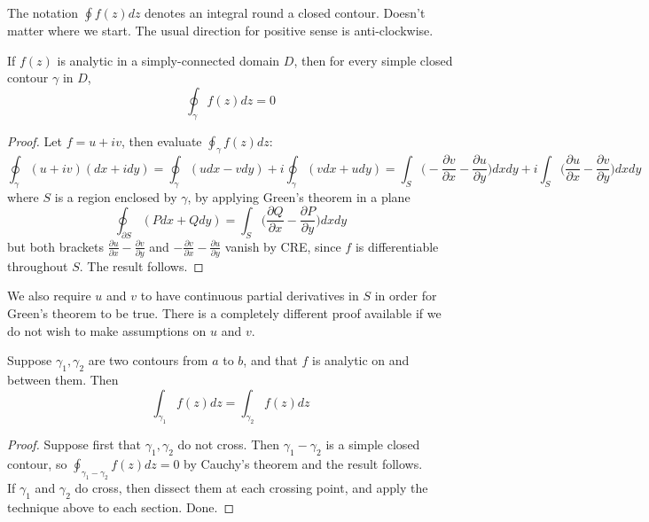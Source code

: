 \documentclass[a4paper]{article}
\begin{document}
\begin{notation}
The notation $\oint f(z)dz$ denotes an integral round a closed contour. Doesn't matter where we start. The usual direction for positive sense is anti-clockwise.
\end{notation}
\begin{thm}
If $f(z)$ is analytic in a simply-connected domain $D$, then for every simple closed contour $\gamma$ in $D$,
$$\oint_\gamma f(z)dz=0$$
\end{thm}
\begin{proof}
Let $f=u+iv$, then evaluate $\oint_\gamma f(z)dz$:
$$\oint_\gamma(u+iv)(dx+idy)=\oint_\gamma(udx-vdy)+i\oint_{\gamma}(vdx+udy)=\int_S\bigg(-\frac{\partial v}{\partial x}-\frac{\partial u}{\partial y}\bigg)dxdy+i\int_S\bigg(\frac{\partial u}{\partial x}-\frac{\partial v}{\partial y}\bigg)dxdy$$
where $S$ is a region enclosed by $\gamma$, by applying Green's theorem in a plane
$$\oint_{\partial S}(Pdx+Qdy)=\int_S\bigg(\frac{\partial Q}{\partial x}-\frac{\partial P}{\partial y}\bigg)dxdy$$
but both brackets $\frac{\partial u}{\partial x}-\frac{\partial v}{\partial y}$ and $-\frac{\partial v}{\partial x}-\frac{\partial u}{\partial y}$ vanish by CRE, since $f$ is differentiable throughout $S$. The result follows.
\end{proof}
\begin{remarks}
We also require $u$ and $v$ to have continuous partial derivatives in $S$ in order for Green's theorem to be true. There is a completely different proof available if we do not wish to make assumptions on $u$ and $v$.
\end{remarks}
\begin{thm}
Suppose $\gamma_1,\gamma_2$ are two contours from $a$ to $b$, and that $f$ is analytic on and between them. Then
$$\int_{\gamma_1}f(z)dz=\int_{\gamma_2}f(z)dz$$
\end{thm}
\begin{proof}
Suppose first that $\gamma_1,\gamma_2$ do not cross. Then $\gamma_1-\gamma_2$ is a simple closed contour, so $\oint_{\gamma_1-\gamma_2}f(z)dz=0$ by Cauchy's theorem and the result follows.\\[5pt]
If $\gamma_1$ and $\gamma_2$ do cross, then dissect them at each crossing point, and apply the technique above to each section. Done.
\end{proof}
\end{document}
